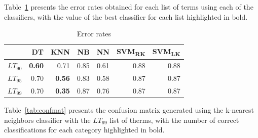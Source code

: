 \documentclass[runningheads,a4paper]{llncs}[2015/06/24]
\begin{document}
Table~\ref{tab:error} presents the error rates obtained for each list
of terms using each of the classifiers, with the value of the best
classifier for each list highlighted in bold.

\begin{table}[H]
    \vspace{-.2cm}
    \caption{Error rates}
\begin{center}
\begin{tabular}{l|rrrrrr}
                 & DT            & KNN           & NB   & NN   & SVM\textsubscript{RK} & SVM\textsubscript{LK} \\ \hline
    $LT_{90}$    & \textbf{0.60} & 0.71          & 0.85 & 0.61 & 0.88                  & 0.88                  \\
    $LT_{95}$    & 0.70          & \textbf{0.56} & 0.83 & 0.58 & 0.87                  & 0.87                  \\
    $LT_{99}$    & 0.70          & \textbf{0.35} & 0.87 & 0.76 & 0.87                  & 0.87                  \\
\end{tabular}
\label{tab:error}
\end{center}
\end{table}

Table~\ref{tab:confmat} presents the confusion matrix generated using
the k-nearest neighbors classifier with the $LT_{99}$ list of therms,
with the number of correct classifications for each category
highlighted in bold.
\end{document}

